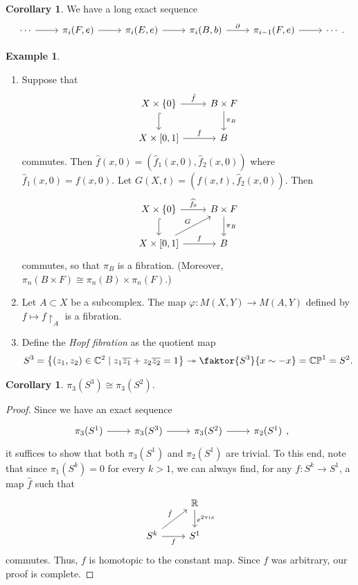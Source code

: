 \documentclass[10pt,letterpaper,cm]{nupset}
\theoremstyle{definition}
\newtheorem{exmp}[defn]{Example}
\theoremstyle{theorem}
\newtheorem{corollary}[defn]{Corollary}
\theoremstyle{remark}
\newcommand{\C}{\mathbb C}
\newcommand{\CP}{\mathbb{CP}}
\newcommand{\R}{\mathbb{R}}
\newcommand{\1}{\mathbb{1}}
\newcommand{\0}{\vec 0}
\newcommand{\be}{\begin{enumerate}}
\newcommand{\ee}{\end{enumerate}}
\begin{document}
\begin{corollary}\label{exhtpy}
We have a long exact sequence 
\[
\begin{tikzcd}
\cdots \arrow[r] & {\pi_i(F, e)} \arrow[r] & {\pi_i(E, e)} \arrow[r] & {\pi_i(B, b)} \arrow[r, "\partial"] & {\pi_{i-1}(F, e)} \arrow[r] & \cdots
\end{tikzcd}
.\]
\end{corollary}

\begin{exmp} $ $
\be
\item Suppose that
\[
\begin{tikzcd}
X\times \{0\} \arrow[d, hook] \arrow[r, "\hat{f}"] & B \times F \arrow[d, "\pi_B"] \\
{X\times [0,1]} \arrow[r, "f"]                           & B                            
\end{tikzcd}
\] commutes. Then $\hat{f}(x,0) = \left(\hat{f}_1(x,0), \hat{f}_2(x,0)\right)$ where $\hat{f}_1(x,0) = f(x,0)$. Let $G(X,t) =  (f(x,t), \hat{f}_2(x,0))$. Then \[
\begin{tikzcd}
X\times \{0\} \arrow[d, hook] \arrow[r, "\widehat{f_0}"] & B \times F \arrow[d, "\pi_B"] \\
{X\times [0,1]} \arrow[r, "f"] \arrow[ru, "G"]           & B                            
\end{tikzcd}
\] commutes, so that $\pi_B$ is a fibration. (Moreover, $\pi_n(B \times F) \cong \pi_n(B) \times \pi_n(F)$.)
\item Let $A \subset X$ be a subcomplex. The map $\varphi : M(X, Y) \to M(A, Y)$ defined by $f \mapsto f\restriction_A$ is a fibration. 
\item Define the \textit{Hopf fibration} as the quotient map
\[
S^3 = \left\{\left(z_1, z_2\right) \in \C^2 \mid z_1\overline{z_1} + z_2\overline{z_2} =1\right\} \twoheadrightarrow \faktor{S^3}{x \sim {-}x} = \CP^1 =S^2.
\]
\ee
\end{exmp}

\begin{corollary}
$\pi_3(S^3) \cong \pi_3(S^2)$.
\end{corollary}
\begin{proof}
Since we have an exact sequence 
\[
\begin{tikzcd}
\pi_3(S^1) \arrow[r] & \pi_3(S^3) \arrow[r] & \pi_3(S^2) \arrow[r] & \pi_2(S^1)
\end{tikzcd},
\] it suffices to show that both $\pi_3(S^1)$ and $\pi_2(S^1)$ are trivial. To this end, note that since $\pi_1(S^k) =0$ for every $k>1$, we can always find,  for any $f: S^k \to S^1$,  a map $\hat{f}$ such that
\[
\begin{tikzcd}
                                                  & \R \arrow[d, "e^{2\pi i x}"] \\
S^k \arrow[r, "f"'] \arrow[ru, "\hat{f}"] & S^1                         
\end{tikzcd}
\] commutes. Thus, $f$ is homotopic to the constant map. Since $f$ was arbitrary, our proof is complete.
\end{proof}
\end{document}
